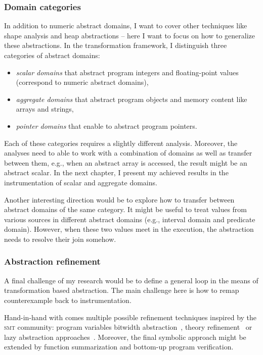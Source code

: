 \subsubsection{ Domain categories }

In addition to numeric abstract domains, I want to cover other techniques like
shape analysis and heap abstractions -- here I want to focus on how to
generalize these abstractions. In the transformation framework, I distinguish
three categories of abstract domains:

\begin{itemize}
    \item \emph{scalar domains} that abstract program integers and floating-point values (correspond to numeric abstract domains),
    \item \emph{aggregate domains} that abstract program objects and memory content like arrays and strings,

    \item \emph{pointer domains} that enable to abstract program pointers.
\end{itemize}

\noindent
Each of these categories requires a slightly different analysis. Moreover,  the
analyses need to able to work with a combination of domains as well as transfer
between them, e.g., when an abstract array is accessed, the result might
be an abstract scalar.  In the next chapter, I present my achieved results in
the instrumentation of scalar and aggregate domains.

Another interesting direction would be to explore how to transfer between
abstract domains of the same category. It might be useful to treat values from
various sources in different abstract domains (e.g., interval domain and
predicate domain). However, when these two values meet in the execution, the
abstraction needs to resolve their join somehow.

\subsubsection{Abstraction refinement}


A final challenge of my research would be to define a general \cegar loop in the
means of transformation based abstraction. The main challenge here is how to
remap counterexample back to instrumentation.

Hand-in-hand with \cegar comes multiple possible refinement techniques inspired
by the \textsc{smt} community: program variables bitwidth
abstraction~\cite{Jonavs2018}, theory refinement~\cite{Hyvarinen2017} or lazy
abstraction approaches~\cite{Henzinger2002}. Moreover, the final symbolic
approach might be extended by function summarization and bottom-up program
verification.

